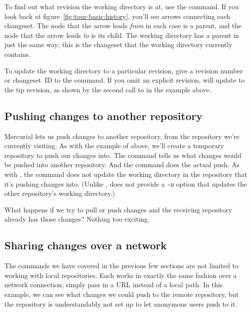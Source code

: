 To find out what revision the working directory is at, use the
 command.
If you look back at figure~\ref{fig:tour-basic:history}, you'll see
arrows connecting each changeset.  The node that the arrow leads
\emph{from} in each case is a parent, and the node that the arrow
leads \emph{to} is its child.  The working directory has a parent in
just the same way; this is the changeset that the working directory
currently contains.

To update the working directory to a particular revision, give a
revision number or changeset~ID to the  command.
If you omit an explicit revision,  will update to the
tip revision, as shown by the second call to  in the
example above.

\subsection{Pushing changes to another repository}

Mercurial lets us push changes to another repository, from the
repository we're currently visiting.  As with the example of
 above, we'll create a temporary repository to push our
changes into.
The  command tells us what changes would be pushed
into another repository.
And the  command does the actual push.
As with , the  command does not update the
working directory in the repository that it's pushing changes into.
(Unlike ,  does not provide a \texttt{-u}
option that updates the other repository's working directory.)

What happens if we try to pull or push changes and the receiving
repository already has those changes?  Nothing too exciting.

\subsection{Sharing changes over a network}

The commands we have covered in the previous few sections are not
limited to working with local repositories.  Each works in exactly the
same fashion over a network connection; simply pass in a URL instead
of a local path.
In this example, we can see what changes we could push to the remote
repository, but the repository is understandably not set up to let
anonymous users push to it.

